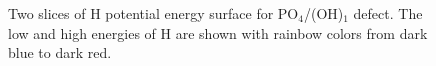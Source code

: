 \begin{figure}[h!]
\begin{minipage}[h]{0.5\linewidth}
\end{minipage}
\hfill
\begin{minipage}[ht]{0.49\linewidth}
\end{minipage}
\caption{Two slices of H potential energy surface for PO$_4$/(OH)$_1$ defect. The low and high energies of H are shown with rainbow colors from dark blue to dark red.}
\label{ris:PES1}
\end{figure}

